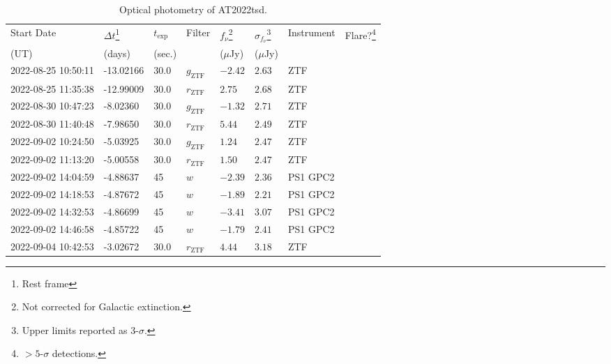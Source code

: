 \documentclass{nature_plusfigure}
\begin{document}
\clearpage

\begin{supplement}

\renewcommand{\thefigure}{Supplementary Information Figure~\arabic{figure}}
\renewcommand{\figurename}{}
\setcounter{figure}{0}
%


\renewcommand{\thetable}{Supplementary Information Table~\arabic{table}}
 \renewcommand{\tablename}{}
\setcounter{table}{0}

\begin{center} 
\begin{longtable}{llllllll} 
\caption{Optical photometry of AT2022tsd.} 
\label{tab:optical-photometry}\\ 
\hline\hline
Start Date & $\Delta t$\footnote{Rest frame} & $t_\mathrm{exp}$ & Filter & $f_\nu$\footnote{Not corrected for Galactic extinction.} & $\sigma_{f_\nu}$\footnote{Upper limits reported as 3-$\sigma$.} & Instrument & Flare?\footnote{$>5$-$\sigma$ detections.}\\ 
(UT) & (days) & (sec.) &  & ($\mu$Jy) & ($\mu$Jy) &  & \\ 
\hline
2022-08-25 10:50:11 & -13.02166 & 30.0 & ${g}_\mathrm{ZTF}$ & $-2.42$ & $2.63$ & ZTF &  \\ 
2022-08-25 11:35:38 & -12.99009 & 30.0 & ${r}_\mathrm{ZTF}$ & $2.75$ & $2.68$ & ZTF &  \\ 
2022-08-30 10:47:23 & -8.02360 & 30.0 & ${g}_\mathrm{ZTF}$ & $-1.32$ & $2.71$ & ZTF &  \\ 
2022-08-30 11:40:48 & -7.98650 & 30.0 & ${r}_\mathrm{ZTF}$ & $5.44$ & $2.49$ & ZTF &  \\ 
2022-09-02 10:24:50 & -5.03925 & 30.0 & ${g}_\mathrm{ZTF}$ & $1.24$ & $2.47$ & ZTF &  \\ 
2022-09-02 11:13:20 & -5.00558 & 30.0 & ${r}_\mathrm{ZTF}$ & $1.50$ & $2.47$ & ZTF &  \\ 
2022-09-02 14:04:59 & -4.88637 & 45 & $w$ & $-2.39$ & $2.36$ & PS1 GPC2 &  \\ 
2022-09-02 14:18:53 & -4.87672 & 45 & $w$ & $-1.89$ & $2.21$ & PS1 GPC2 &  \\ 
2022-09-02 14:32:53 & -4.86699 & 45 & $w$ & $-3.41$ & $3.07$ & PS1 GPC2 &  \\ 
2022-09-02 14:46:58 & -4.85722 & 45 & $w$ & $-1.79$ & $2.41$ & PS1 GPC2 &  \\ 
2022-09-04 10:42:53 & -3.02672 & 30.0 & ${r}_\mathrm{ZTF}$ & $4.44$ & $3.18$ & ZTF &  \\ 

\end{longtable}
\end{center}
\end{supplement}
\end{document}
